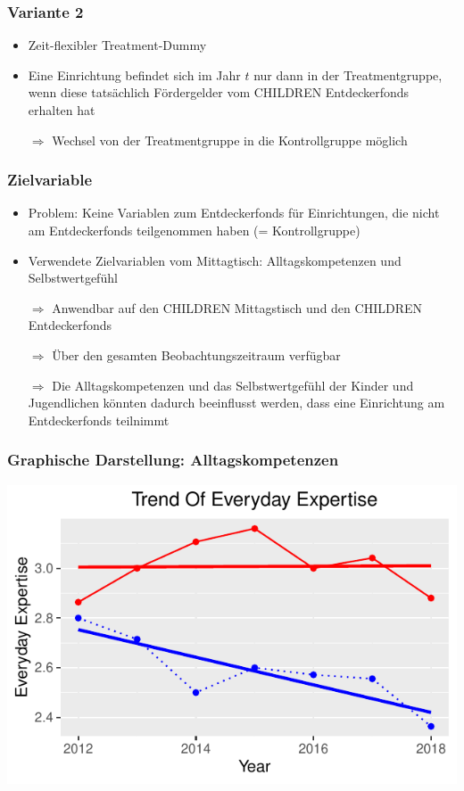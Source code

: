 \begin{frame}[fragile]
\begin{frame}[fragile]
\begin{frame}[fragile]
\frametitle{Variante 2}
\begin{itemize}
\item Zeit-flexibler Treatment-Dummy
\item Eine Einrichtung befindet sich im Jahr $t$ nur dann in der Treatmentgruppe, wenn diese tatsächlich Fördergelder vom CHILDREN Entdeckerfonds erhalten hat
\item [$\Rightarrow$] Wechsel von der Treatmentgruppe in die Kontrollgruppe möglich
\end{itemize}
\end{frame}

\begin{frame}[fragile]
\frametitle{Zielvariable}
\begin{itemize}
\item Problem: Keine Variablen zum Entdeckerfonds für Einrichtungen, die nicht am Entdeckerfonds teilgenommen haben (= Kontrollgruppe) 
\item Verwendete Zielvariablen vom Mittagtisch: Alltagskompetenzen und Selbstwertgefühl
\item [$\Rightarrow$] Anwendbar auf den CHILDREN Mittagstisch und den CHILDREN Entdeckerfonds 
\item [$\Rightarrow$] Über den gesamten Beobachtungszeitraum verfügbar
\item [$\Rightarrow$] Die Alltagskompetenzen und das Selbstwertgefühl der Kinder und Jugendlichen könnten dadurch beeinflusst werden, dass eine Einrichtung am Entdeckerfonds teilnimmt
\end{itemize}
\end{frame}

\begin{frame}[fragile]
\frametitle{Graphische Darstellung: Alltagskompetenzen}
\begin{knitrout}\footnotesize
{}\color{fgcolor}

{\centering \includegraphics[width=\maxwidth]{figure/beamer-DIDDtdsplot-1} 

}
\end{knitrout}
\end{frame}
\end{frame}
\end{frame}
